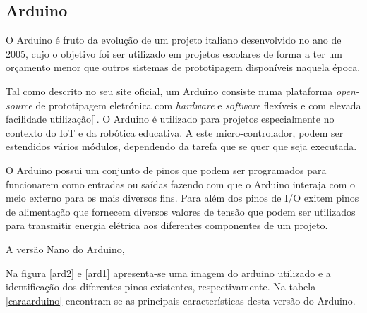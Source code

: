 \subsection{Arduino}


O Arduino é fruto da evolução de um projeto italiano desenvolvido no ano de 2005, cujo o objetivo foi ser utilizado em projetos escolares de forma a ter um orçamento menor que outros sistemas de prototipagem disponíveis naquela época.

Tal como descrito no seu site oficial, um Arduino consiste numa plataforma \textit{open-source} de prototipagem eletrónica com \textit{hardware} e \textit{software} flexíveis e com elevada facilidade utilização[]. O Arduino é utilizado para projetos especialmente no contexto do \ac{IoT} e da robótica educativa. A este micro-controlador, podem ser estendidos vários módulos, dependendo da tarefa que se quer que seja executada. 


O Arduino possui um conjunto de pinos que podem ser programados para funcionarem como entradas ou saídas fazendo com que o Arduino interaja com o meio externo para os mais diversos fins. Para além dos pinos de I/O exitem pinos de alimentação que fornecem diversos valores de tensão que podem ser utilizados para transmitir energia elétrica aos diferentes componentes de um projeto. 

A versão Nano do Arduino, 

Na figura \ref{ard2} e \ref{ard1} apresenta-se uma imagem do arduino utilizado e a identificação dos diferentes pinos existentes, respectivamente. Na tabela \ref{caraarduino} encontram-se as principais características desta versão do Arduino. 


